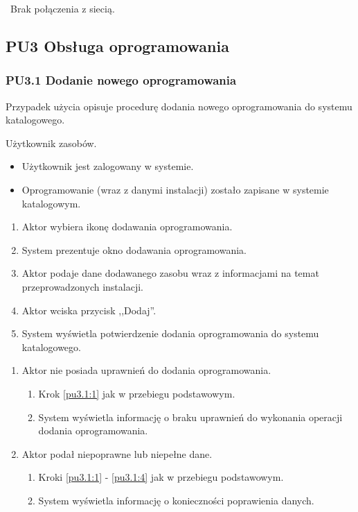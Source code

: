 \
Brak połączenia z siecią.

\subsection{PU3 Obsługa oprogramowania} \label{pu3}
\subsubsection{PU3.1 Dodanie nowego oprogramowania}

Przypadek użycia opisuje procedurę dodania nowego oprogramowania do systemu katalogowego.

Użytkownik zasobów.

\begin{itemize}
\item Użytkownik jest zalogowany w systemie.
\end{itemize}

\begin{itemize}
\item Oprogramowanie (wraz z danymi instalacji) zostało zapisane w systemie katalogowym.
\end{itemize}

\begin{enumerate}
\item \label{pu3.1:1} Aktor wybiera ikonę dodawania oprogramowania.
\item System prezentuje okno dodawania oprogramowania.
\item Aktor podaje dane dodawanego zasobu wraz z informacjami na temat przeprowadzonych instalacji.
\item \label{pu3.1:4} Aktor wciska przycisk ,,Dodaj''.
\item System wyświetla potwierdzenie dodania oprogramowania do systemu katalogowego.
\end{enumerate}

\begin{enumerate}
\item Aktor nie posiada uprawnień do dodania oprogramowania.
	\begin{enumerate}[label*=\arabic*.]
		\item Krok \ref{pu3.1:1} jak w przebiegu podstawowym.
		\item System wyświetla informację o braku uprawnień do wykonania operacji dodania oprogramowania.
	\end{enumerate}
\item Aktor podał niepoprawne lub niepełne dane.
	\begin{enumerate}[label*=\arabic*.]
		\item Kroki \ref{pu3.1:1} - \ref{pu3.1:4} jak w przebiegu podstawowym.
		\item System wyświetla informację o konieczności poprawienia danych.
	\end{enumerate}
\end{enumerate}

